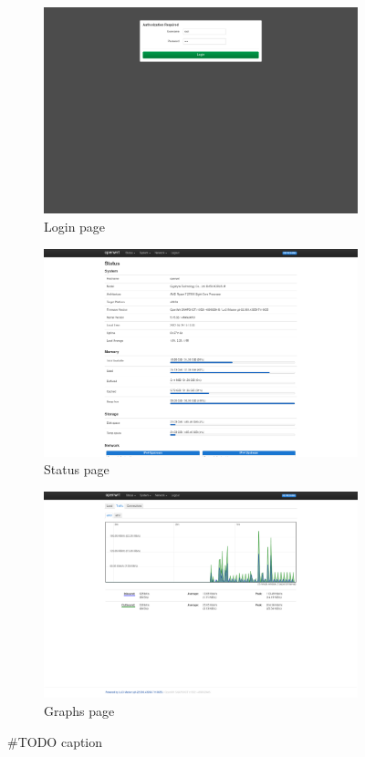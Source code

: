 \begin{figure}[h]

    \centering

    \begin{subfigure}{0.5\textwidth}
        \centering
        \includegraphics[height=0.6\linewidth]{immagini/LuCI_login}
        \caption{Login page}
        \label{fig:luci-login}
    \end{subfigure}%
    \hfill
    \begin{subfigure}{0.5\textwidth}
        \centering
        \includegraphics[height=0.6\linewidth]{immagini/LuCI_status}
        \caption{Status page}
        \label{fig:luci-status}
    \end{subfigure}%

    \begin{subfigure}{0.5\textwidth}
        \centering
        \includegraphics[height=0.6\linewidth]{immagini/LuCI_graphs}
        \caption{Graphs page}
        \label{fig:luci-graphs}
    \end{subfigure}%
    \caption{\#TODO caption}
\end{figure}